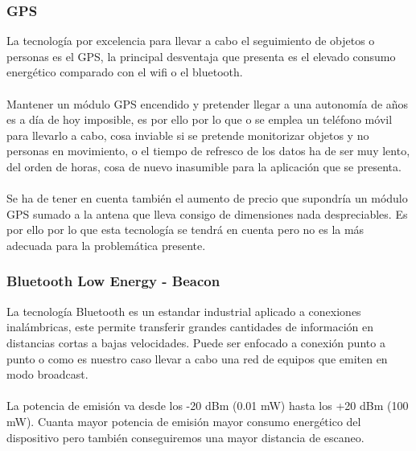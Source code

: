 \documentclass[paper=a4, fontsize=11pt,twoside]{scrartcl}	%
\begin{document}
        \subsubsection {GPS}
            La tecnología por excelencia para llevar a cabo el seguimiento de objetos o personas es el GPS, la principal desventaja
            que presenta es el elevado consumo energético comparado con el wifi o el bluetooth.
            \paragraph{}
            Mantener un módulo GPS encendido y pretender llegar a una autonomía de años es a día de hoy
            imposible, es por ello por lo que o se emplea un teléfono móvil para llevarlo a cabo, cosa inviable si se pretende 
            monitorizar objetos  y no personas en movimiento, o el tiempo de refresco de los datos ha de ser muy lento, del orden de horas,
            cosa de nuevo inasumible para la aplicación que se presenta.
            \paragraph{}
            Se ha de tener en cuenta también el aumento de precio que supondría un módulo GPS sumado a la antena que lleva consigo de 
            dimensiones nada despreciables. 
            Es por ello por lo que esta tecnología se tendrá en cuenta pero no es la más adecuada para la problemática presente.
        \subsubsection {Bluetooth Low Energy - Beacon}
            La tecnología Bluetooth es un estandar industrial aplicado a conexiones inalámbricas, este permite transferir 
            grandes cantidades de información en distancias cortas a bajas velocidades. Puede ser enfocado a conexión
            punto a punto o como es nuestro caso llevar a cabo una red de equipos que emiten en modo broadcast.
            \paragraph{}
            La potencia de emisión va desde los -20 dBm (0.01 mW) hasta los +20 dBm (100 mW). Cuanta mayor potencia de emisión mayor consumo energético
            del dispositivo pero también conseguiremos una mayor distancia de escaneo.
\end{document}
